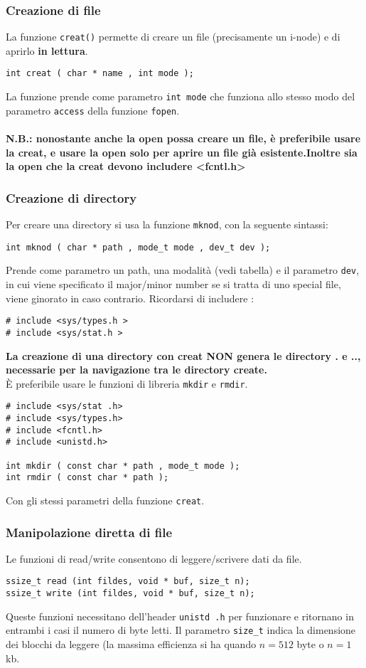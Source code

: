 \documentclass[a4paper]{article}
\begin{document}
\subsubsection{Creazione di file}
La funzione \verb|creat()| permette di creare un file (precisamente un i-node) e di aprirlo \textbf{in lettura}.
\begin{verbatim}
int creat ( char * name , int mode );
\end{verbatim}
La funzione prende come parametro \verb|int mode| che funziona allo stesso modo del parametro \verb|access| della funzione \verb|fopen|.
\\ \\
\textbf{N.B.: nonostante anche la open possa creare un file, è preferibile usare la creat, e usare la open solo per aprire un file già esistente.Inoltre sia la open che la creat devono includere <fcntl.h>}

\subsubsection{Creazione di directory}
Per creare una directory si usa la funzione \verb|mknod|, con la seguente sintassi:
\begin{verbatim}
int mknod ( char * path , mode_t mode , dev_t dev );
\end{verbatim}
Prende come parametro un path, una modalità (vedi tabella) e il parametro \verb|dev|, in cui viene specificato il major/minor number se si tratta di uno special file, viene ginorato in caso contrario.
Ricordarsi di includere :
\begin{verbatim}
# include <sys/types.h >
# include <sys/stat.h >
\end{verbatim}


\textbf{La creazione di una directory con creat NON genera le directory . e .., necessarie per la navigazione tra le directory create.}\newline
\\
È preferibile usare le funzioni di libreria \verb|mkdir| e \verb|rmdir|.
\begin{verbatim}
# include <sys/stat .h>
# include <sys/types.h>
# include <fcntl.h>
# include <unistd.h>

int mkdir ( const char * path , mode_t mode );
int rmdir ( const char * path );
\end{verbatim}
Con gli stessi parametri della funzione \verb|creat|.

\subsubsection{Manipolazione diretta di file}
Le funzioni di read/write consentono di leggere/scrivere dati da file.
\begin{verbatim}
ssize_t read (int fildes, void * buf, size_t n);
ssize_t write (int fildes, void * buf, size_t n);
\end{verbatim}
Queste funzioni necessitano dell'header \verb|unistd .h| per funzionare e ritornano in entrambi i casi il numero di byte letti.
Il parametro \verb|size_t| indica la dimensione dei blocchi da leggere (la massima efficienza si ha quando $n=512$ byte o $n=1$ kb.
\end{document}
